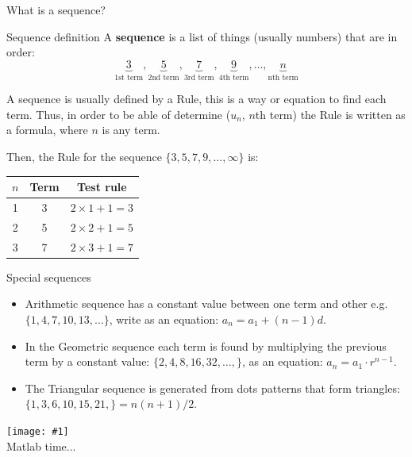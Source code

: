 \documentclass[newPxFont]{beamer}
\newcommand \imageFrame[2]{
\begingroup
\begin{frame}
  \begin{center}
\texttt{[image: \#1]}\\
\Large #2
    \end{center}
\end{frame}
\endgroup
}
\begin{document}
\begin{frame}{What is a sequence?}
  \begin{block}{Sequence definition}
    A \textbf{sequence} is a list of things (usually numbers) that are in order:\\
    \begin{equation}
          \underbrace{3}_{\text{1st term}},\underbrace {5}_{\text{2nd term}} ,\underbrace {7}_{\text{3rd term}},\underbrace {9}_{\text{4th term}},\hdots, \underbrace{n}_{\text{nth term}}
    \end{equation}
  \end{block}
  \pause
  A sequence is usually defined by a \alert{Rule}, this is a way or equation to find each term\cite{Math2017}. Thus, in order to be able of determine ($u_n$, $n$th term) the \alert{Rule} is written as a formula, where $n$ is any term.
\end{frame}
\begin{frame}
    Then, the \alert{Rule} for the sequence $\{ 3,5,7,9,\hdots,\infty\}$ is:
    \begin{table}
      \begin{tabular}{ccc}
     $n$ &\bfseries Term &\bfseries Test rule \\\toprule
     1 & 3 & $2\times 1 +1=3$\\
     2 & 5 & $2\times 2 +1=5$\\
     3 & 7 & $2\times 3 +1=7$\\
     \bottomrule
     \end{tabular}
    \end{table}
\end{frame}
\begin{frame}{Special sequences}
  \begin{itemize}
    \item <1-> \alert{Arithmetic} sequence has a \alert{constant} value between one term and other e.g. $\{1,4,7,10,13,\hdots\}$, write as an equation: $a_n=a_1+(n-1)d$.
    \item <2-> In the \alert{Geometric} sequence each term is found by multiplying the previous term by a \alert{constant} value: $\{2,4,8,16,32,\hdots,\}$, as an equation:  $a_n=a_1\cdot r^{n-1}$.
    \item <3-> The \alert{Triangular} sequence is generated from dots patterns that form triangles: $\{1,3,6,10,15,21,\}= n(n+1)/2$.
  \end{itemize}
\end{frame}
\imageFrame{exer1}{Matlab time...}
\end{document}
